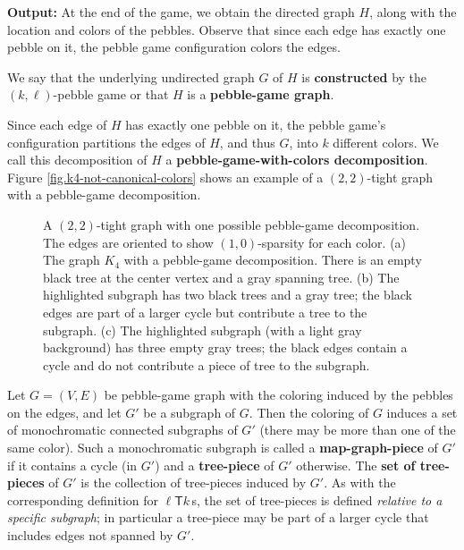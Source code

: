 \documentclass[Svgc,nospthms]{Svgc}
\newcommand{\ellteekay}{\ensuremath{\ell{\mathsf T}k}\,}
\newcommand{\reffig}[1]{Figure \ref{fig.#1}}
\begin{document}
	{\bf Output:} At the end of the game, we obtain the directed graph $H$,
	along with the location and colors of the pebbles.  Observe that 
	since each edge has exactly one pebble on it, the pebble game configuration
	colors the edges.
	
	We say that the underlying undirected graph $G$ of $H$ is {\bf constructed}
	by the $(k,\ell)$-pebble game or that $H$ is a {\bf pebble-game graph}.

	Since each edge of $H$ has exactly one pebble on it, the pebble game's 
	configuration partitions the edges of $H$, and thus $G$, into $k$ different colors.  We call
	this decomposition of $H$ a {\bf pebble-game-with-colors decomposition}.  
	\reffig{k4-not-canonical-colors} 
	shows an example of a $(2,2)$-tight graph with a 
	pebble-game decomposition.  

	\begin{figure}[htbp]
		\centering
		\hspace{.3in}
		\hspace{.3in}
		\caption{A $(2,2)$-tight graph with one possible pebble-game decomposition.  The edges are oriented
		to show $(1,0)$-sparsity for each color.  (a) The graph $K_4$ with a pebble-game decomposition.
		There is an empty black tree at the center vertex and a gray spanning tree.  (b) The highlighted
		subgraph has two black trees and a gray tree; the black edges are part of a larger cycle but 
		contribute a tree to the subgraph.  (c) The highlighted subgraph (with a light gray background)
		has three empty gray trees;
		the black edges contain a cycle and do not contribute a piece of tree to the subgraph.}
	\end{figure}
	
	\medskip
	Let $G=(V,E)$ be pebble-game graph with the coloring induced by the 
	pebbles on the edges, and let $G'$ be a subgraph of $G$.  Then 
	the coloring of $G$ induces a set of monochromatic connected 
	subgraphs of $G'$ (there may be more than one of the same color).
	Such a monochromatic subgraph is called a \textbf{map-graph-piece}
	of $G'$ if it contains a cycle (in $G'$) and a \textbf{tree-piece}
	of $G'$ otherwise.  The \textbf{set of tree-pieces} of $G'$ 
	is the collection of tree-pieces induced by $G'$. As with the
	corresponding definition for $\ellteekay$s, the set of tree-pieces 
	is defined \emph{relative to a specific subgraph}; in particular 
	a tree-piece may be part of a larger cycle that includes edges 
	not spanned by $G'$.
	
\end{document}
